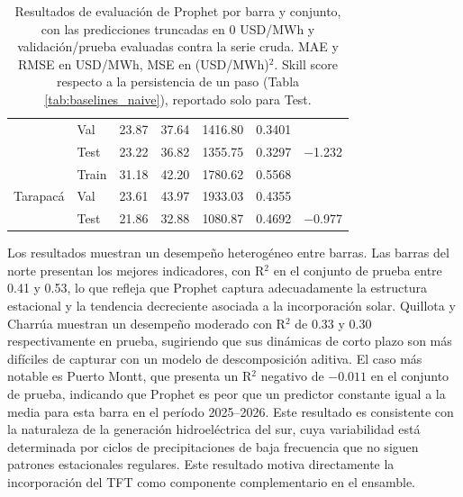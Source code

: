 \begin{table}[htbp]
\begin{tabular}{llrrrrr}
            & Val   & 23.87 & 37.64 & 1416.80 &  0.3401 & \\
            & Test  & 23.22 & 36.82 & 1355.75 &  0.3297 & $-$1.232 \\
        \midrule
        \multirow{3}{*}{Tarapacá}
            & Train & 31.18 & 42.20 & 1780.62 &  0.5568 & \\
            & Val   & 23.61 & 43.97 & 1933.03 &  0.4355 & \\
            & Test  & 21.86 & 32.88 & 1080.87 &  0.4692 & $-$0.977 \\
        \bottomrule
    \end{tabular}
    \vspace{0.2cm}
    \caption{Resultados de evaluación de Prophet por barra y conjunto, con las predicciones truncadas en 0 USD/MWh y validación/prueba evaluadas contra la serie cruda. MAE y RMSE en USD/MWh, MSE en (USD/MWh)$^2$. Skill score respecto a la persistencia de un paso (Tabla \ref{tab:baselines_naive}), reportado solo para Test.}
    \label{tab:prophet_resultados}
\end{table}

Los resultados muestran un desempeño heterogéneo entre barras. Las barras del norte presentan los mejores indicadores, con R$^2$ en el conjunto de prueba entre 0.41 y 0.53, lo que refleja que Prophet captura adecuadamente la estructura estacional y la tendencia decreciente asociada a la incorporación solar. Quillota y Charrúa muestran un desempeño moderado con R$^2$ de 0.33 y 0.30 respectivamente en prueba, sugiriendo que sus dinámicas de corto plazo son más difíciles de capturar con un modelo de descomposición aditiva. El caso más notable es Puerto Montt, que presenta un R$^2$ negativo de $-0.011$ en el conjunto de prueba, indicando que Prophet es peor que un predictor constante igual a la media para esta barra en el período 2025--2026. Este resultado es consistente con la naturaleza de la generación hidroeléctrica del sur, cuya variabilidad está determinada por ciclos de precipitaciones de baja frecuencia que no siguen patrones estacionales regulares. Este resultado motiva directamente la incorporación del TFT como componente complementario en el ensamble.

